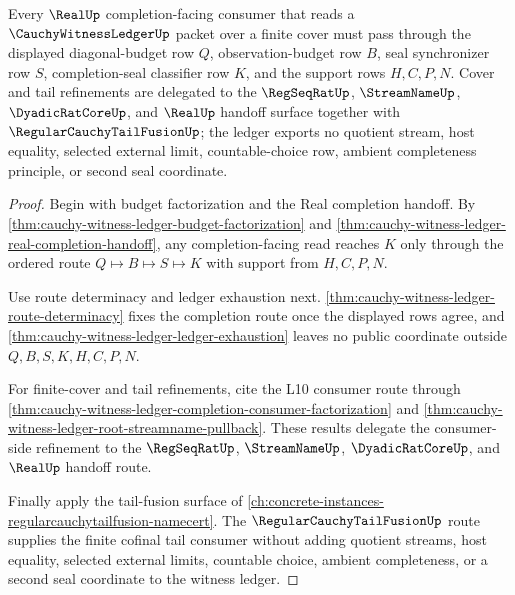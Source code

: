 \begin{theorem}
\label{thm:cauchy-witness-ledger-real-seal-cover-consumer-lock}
Every $\RealUp$ completion-facing consumer that reads a $\CauchyWitnessLedgerUp$ packet over a finite cover must pass through the displayed diagonal-budget row $Q$, observation-budget row $B$, seal synchronizer row $S$, completion-seal classifier row $K$, and the support rows $H,C,P,N$. Cover and tail refinements are delegated to the $\RegSeqRatUp$, $\StreamNameUp$, $\DyadicRatCoreUp$, and $\RealUp$ handoff surface together with $\RegularCauchyTailFusionUp$; the ledger exports no quotient stream, host equality, selected external limit, countable-choice row, ambient completeness principle, or second seal coordinate.
\end{theorem}
\begin{proof}
Begin with budget factorization and the Real completion handoff. By \autoref{thm:cauchy-witness-ledger-budget-factorization} and \autoref{thm:cauchy-witness-ledger-real-completion-handoff}, any completion-facing read reaches $K$ only through the ordered route $Q \longmapsto B \longmapsto S \longmapsto K$ with support from $H,C,P,N$.

Use route determinacy and ledger exhaustion next. \autoref{thm:cauchy-witness-ledger-route-determinacy} fixes the completion route once the displayed rows agree, and \autoref{thm:cauchy-witness-ledger-ledger-exhaustion} leaves no public coordinate outside $Q,B,S,K,H,C,P,N$.

For finite-cover and tail refinements, cite the L10 consumer route through \autoref{thm:cauchy-witness-ledger-completion-consumer-factorization} and \autoref{thm:cauchy-witness-ledger-root-streamname-pullback}. These results delegate the consumer-side refinement to the $\RegSeqRatUp$, $\StreamNameUp$, $\DyadicRatCoreUp$, and $\RealUp$ handoff route.

Finally apply the tail-fusion surface of \autoref{ch:concrete-instances-regularcauchytailfusion-namecert}. The $\RegularCauchyTailFusionUp$ route supplies the finite cofinal tail consumer without adding quotient streams, host equality, selected external limits, countable choice, ambient completeness, or a second seal coordinate to the witness ledger.
\end{proof}
